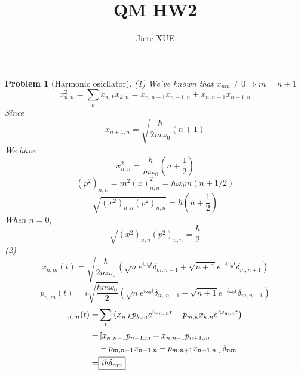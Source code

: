 \documentclass{article}
\title{QM HW2}
\author{Jiete XUE}
\date{\mydate}
\theoremstyle{t}
\newtheorem{problem}{Problem}
\begin{document}
\maketitle
\begin{problem}[Harmonic osicllator]
(1) We've known that $x_{nm}\not=0\Rightarrow m=n\pm1$
\begin{equation}
    x_{n,n}^2=\sum_{k}x_{n,k}x_{k,n}=x_{n, n-1}x_{n-1,n}+x_{n, n+1}x_{n+1,n}
\end{equation}
Since
\begin{equation}
    x_{n+1,n}=\sqrt{\frac{\hbar}{2m\omega_0}(n+1)}
\end{equation}
We have 
\begin{equation}
    \boxed{x_{n,n}^2=\frac{\hbar}{m\omega_0}\left(n+\frac{1}{2}\right)}
\end{equation}
\begin{equation}
        (p^2)_{n,n}=m^2 (\dot{x})_{n,n}^{2} =\hbar \omega_0m (n + 1/2) 
\end{equation}
\begin{equation}
    \boxed{\sqrt{(x^2)_{n,n}(p^2)_{n,n}}=\hbar\left(n+\frac{1}{2}\right)}
\end{equation}
When $n=0$,
\begin{equation}
   \sqrt{(x^2)_{n,n}(p^2)_{n,n}}=\frac{\hbar}{2} 
\end{equation}
(2) 
\begin{equation}
    \boxed{x_{n,m}(t)=\sqrt{\frac{\hbar}{2m\omega_0}}\left(\sqrt{n}e^{i\omega_0t}\delta_{m,n-1}+\sqrt{n+1}e^{-i\omega_0t}\delta_{m,n+1}\right)}
\end{equation}
\begin{equation}
    \boxed{p_{n,m}(t)=i\sqrt{\frac{\hbar m\omega_0}{2}}\left(\sqrt{n}e^{i\omega_0t}\delta_{m,n-1}-\sqrt{n+1}e^{-i\omega_0 t}\delta_{m,n+1}\right)}
\end{equation}
\begin{align}
    [x,p]_{n,m}(t)=&\sum_{k}\left(x_{n,k}p_{k,m}e^{i\omega_{n,m}t}-p_{m,k}x_{k,n}e^{i\omega_{m,n}t}\right)\\
   =&\left[x_{n,n-1}p_{n-1,m}+x_{n,n+1}p_{n+1,m}\right.\notag\\
   &-p_{m,n-1}x_{n-1,n}-p_{m,n+1}x_{n+1,n}\left.\right]\delta_{nm}\\
   =& \boxed{i\hbar\delta_{nm}}
\end{align}
\end{problem}
\end{document}
